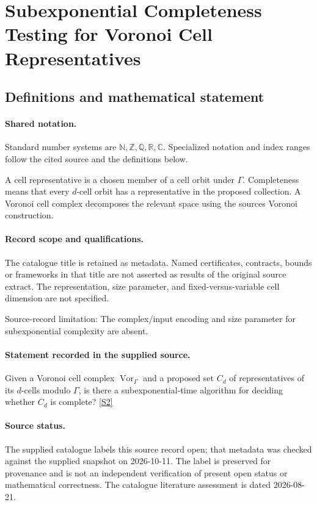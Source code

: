 \documentclass[11pt]{article}
\newcommand{\sref}[2]{\hyperlink{source:#1:#2}{[S#2]}}
\begin{document}
\section{Subexponential Completeness Testing for Voronoi Cell Representatives}\label{statement}

\subsection{Definitions and mathematical statement}

\paragraph{Shared notation.}Standard number systems are $\mathbb N,\mathbb Z,\mathbb Q,\mathbb R,\mathbb C$. Specialized notation and index ranges follow the cited source and the definitions below.


A cell representative is a chosen member of a cell orbit under $\Gamma$. Completeness means that every $d$-cell orbit has a representative in the proposed collection. A Voronoi cell complex decomposes the relevant space using the source\textquotesingle s Voronoi construction.
\paragraph{Record scope and qualifications.}
The catalogue title is retained as metadata. Named certificates, contracts, bounds or frameworks in that title are not asserted as results of the original source extract.
The representation, size parameter, and fixed-versus-variable cell dimension are not specified.

Source-record limitation: The complex/input encoding and size parameter for subexponential complexity are absent.
\paragraph{Statement recorded in the supplied source.}
Given a Voronoi cell complex $\operatorname{Vor}_\Gamma$ and a proposed set $C_d$ of representatives of its $d$-cells modulo $\Gamma$, is there a subexponential-time algorithm for deciding whether $C_d$ is complete? \sref{statement}{2}
\paragraph{Source status.}
The supplied catalogue labels this source record open; that metadata was checked against the supplied snapshot on 2026-10-11. The label is preserved for provenance and is not an independent verification of present open status or mathematical correctness. The catalogue literature assessment is dated 2026-08-21.
\end{document}
